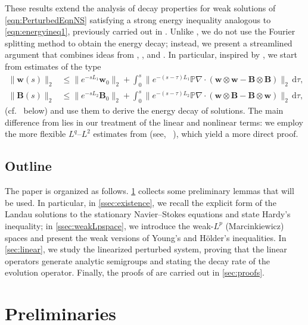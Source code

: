 \documentclass[10pt]{amsart}
\theoremstyle{plain}
\theoremstyle{definition}
\theoremstyle{remark}
\numberwithin{equation}{section}
\newcommand{\bw}{{\boldsymbol{w}}}
\newcommand{\bB}{{\boldsymbol{B}}}
\begin{document}
These results extend the analysis of decay properties for weak solutions of \cref{eqn:PerturbedEqnNS} satisfying a strong energy inequality analogous to \cref{eqn:energyineq1}, previously carried out in \cite{HishidaSchonbek16}. Unlike \cite{HishidaSchonbek16}, we do not use the Fourier splitting method to obtain the energy decay; instead, we present a streamlined argument that combines ideas from \cite{HishidaSchonbek16}, \cite{KarchPilarczyk2011}, and \cite{BorchersMiyakawa92}. In particular, inspired by \cite{KarchPilarczyk2011}, we start from estimates of the type 
\begin{align*}
\|\bw(s)\|_2 
&\leq \|e^{-sL_1} \bw_0\|_2 
+ \int_0^s \bigl\|e^{-(s-\tau)L_1} \mathbb{P} \nabla\cdot (\bw \otimes \bw - \bB \otimes \bB)\bigr\|_2 \, \mathrm{d}\tau, \\
\|\bB(s)\|_2 
&\leq \|e^{-sL_2} \bB_0\|_2 
+ \int_0^s \bigl\|e^{-(s-\tau)L_2} \mathbb{P} \nabla\cdot (\bw \otimes \bB - \bB \otimes \bw)\bigr\|_2 \, \mathrm{d}\tau,
\end{align*}
(cf.~ below) and use them to derive the energy decay of solutions. The main difference from \cite{KarchPilarczyk2011} lies in our treatment of the linear and nonlinear terms: we employ the more flexible $L^q$--$L^2$ estimates from \cite{HishidaSchonbek16} (see, ~), which yield a more direct proof.

\subsection{Outline} 
The paper is organized as follows. \cref{sec:prelim} collects some preliminary lemmas that will be used. 
In particular, in \cref{ssec:existence}, we recall the explicit form of the Landau solutions to the stationary Navier--Stokes equations and state Hardy's inequality; in \cref{ssec:weakLpspace}, we introduce the weak-$L^p$ (Marcinkiewicz) spaces and present the weak versions of Young's and H\"older's inequalities.
In \cref{sec:linear}, we study the linearized perturbed system, proving that the linear operators generate analytic semigroups and stating the decay rate of the evolution operator. Finally, the proofs of  are carried out in \cref{sec:proofs}.


\section{Preliminaries}
\label{sec:prelim}
\end{document}

